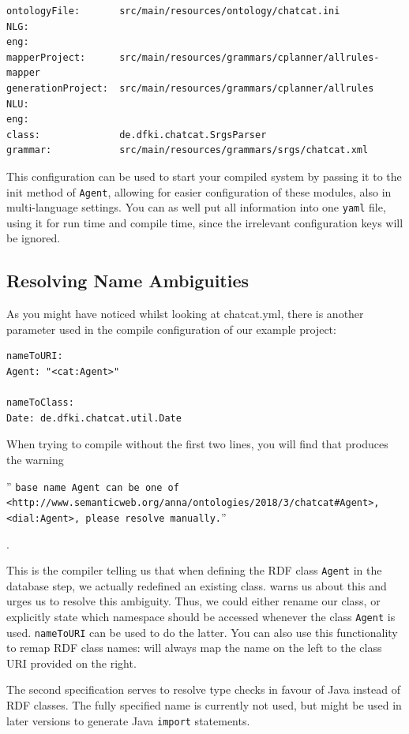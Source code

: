 \begin{verbatim}
ontologyFile:       src/main/resources/ontology/chatcat.ini
NLG:
eng:
mapperProject:      src/main/resources/grammars/cplanner/allrules-mapper
generationProject:  src/main/resources/grammars/cplanner/allrules
NLU:
eng:
class:              de.dfki.chatcat.SrgsParser
grammar:            src/main/resources/grammars/srgs/chatcat.xml
\end{verbatim}

This configuration can be used to start your compiled system by passing it to
the init method of \texttt{Agent}, allowing for easier configuration of these
modules, also in multi-language settings. You can as well put all information
into one \texttt{yaml} file, using it for run time and compile time, since the
irrelevant configuration keys will be ignored.

\subsection{Resolving Name Ambiguities} \label{sec:nsAmbigue}

As you might have noticed whilst looking at chatcat.yml, there is another
parameter used in the compile configuration of our example project:

\begin{verbatim}
nameToURI:
Agent: "<cat:Agent>"

nameToClass:
Date: de.dfki.chatcat.util.Date
\end{verbatim}

When trying to compile without the first two lines, you will find that \vonda
produces the warning \begin{small}'' \texttt{base name Agent can be one of
    <http://www.semanticweb.org/anna/ontologies/2018/3/chatcat\#Agent>,
    <dial:Agent>, please resolve manually.}''
\end{small}.

This is the compiler telling us that when defining the RDF class \texttt{Agent}
in the database step, we actually redefined an existing class. \vonda warns us
about this and urges us to resolve this ambiguity. Thus, we could either rename
our class, or explicitly state which namespace should be accessed whenever the
class \texttt{Agent} is used. \texttt{nameToURI} can be used to do the latter.
You can also use this functionality to remap RDF class names: \vonda will
always map the name on the left to the class URI provided on the right.

The second specification serves to resolve type checks in favour of Java
instead of RDF classes. The fully specified name is currently not used, but
might be used in later versions to generate Java \texttt{import} statements.

